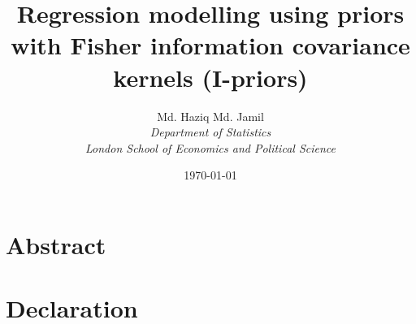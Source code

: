 \documentclass[a4paper,showframe]{report}
\begin{document}
\title{Regression modelling using priors with Fisher information covariance kernels (I-priors)}
\author{
  Md. Haziq Md. Jamil\\
  \normalsize{\it{Department of Statistics}}\\
  \normalsize{\it{London School of Economics and Political Science}}
}
\date{\normalsize\today}
\maketitle

\newpage  %
\setcounter{page}{2}

  \chapter*{Abstract} 
  \chapter*{Declaration} 
\hTOCandLists
{}
\clearpage
\end{document}
